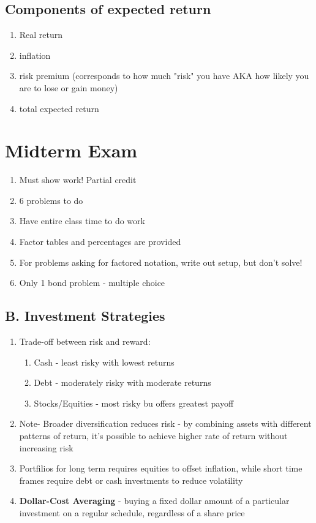 \documentclass{report} %
\begin{document}
\subsection*{Components of expected return}
\begin{enumerate}
    \item Real return
    \item inflation
    \item risk premium (corresponds to how much "risk" you have AKA how likely you are to lose or gain money)
    \item total expected return
\end{enumerate}

\section*{Midterm Exam}
\begin{enumerate}
    \item Must show work! Partial credit
    \item 6 problems to do
    \item Have entire class time to do work
    \item Factor tables and percentages are provided
    \item For problems asking for factored notation, write out setup, but don't solve!
    \item Only 1 bond problem - multiple choice
\end{enumerate}

\subsection*{B. Investment Strategies}
\begin{enumerate}
    \item Trade-off between risk and reward:
    \begin{enumerate}
        \item Cash - least risky with lowest returns
        \item Debt - moderately risky with moderate returns
        \item Stocks/Equities - most risky bu offers greatest payoff
    \end{enumerate}
    \item Note- Broader diversification reduces risk - by combining assets with different patterns of return, it's possible to achieve higher rate of return without increasing risk
    \item Portfilios for long term requires equities to offset inflation, while short time frames require debt or cash investments to reduce volatility
    \item\textbf{Dollar-Cost Averaging} - buying a fixed dollar amount of a particular investment on a regular schedule, regardless of a share price
\end{enumerate}
\end{document}
